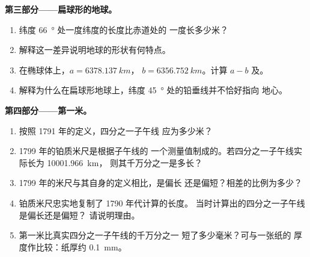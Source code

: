 \begin{problem}
\medskip
\noindent\textbf{第三部分——扁球形的地球。}
\begin{enumerate}[resume]
  \item 纬度 \qty{66}{\degree} 处一度纬度的长度比赤道处的
        一度长多少米？
  \item 解释这一差异说明地球的形状有何特点。
  \item 在椭球体上，$a = \qty{6378.137}{km}$，
        $b = \qty{6356.752}{km}$。计算 $a - b$ 及。
  \item 解释为什么在扁球形地球上，纬度
        \qty{45}{\degree} 处的铅垂线并不恰好指向
        地心。
\end{enumerate}

\medskip
\noindent\textbf{第四部分——第一米。}
\begin{enumerate}[resume]
  \item 按照 1791 年的定义，四分之一子午线
        应为多少米？
  \item 1799 年的铂质米尺是根据子午线的
        一个测量值制成的。若四分之一子午线实际长为 \qty{10001.966}{km}，
        则其千万分之一是多长？
  \item 1799 年的米尺与其自身的定义相比，是偏长
        还是偏短？相差的比例为多少？
  \item 铂质米尺忠实地复制了 1790 年代计算的长度。
        当时计算出的四分之一子午线是偏长还是偏短？
        请说明理由。
  \item 第一米比真实四分之一子午线的千万分之一
        短了多少毫米？可与一张纸的
        厚度作比较：纸厚约 \qty{0.1}{mm}。
\end{enumerate}
\end{problem}
